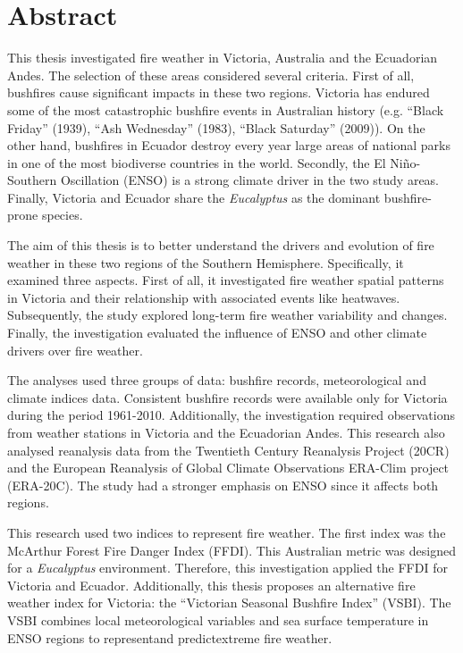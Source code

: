 
\chapter*{Abstract}

This thesis investigated fire weather in Victoria, Australia and the
Ecuadorian Andes. The selection of these areas considered several
criteria. First of all, bushfires cause significant impacts in these
two regions. Victoria has endured some of the most catastrophic bushfire
events in Australian history (e.g. \textquotedblleft Black Friday\textquotedblright{}
(1939), \textquotedblleft Ash Wednesday\textquotedblright{} (1983),
\textquotedblleft Black Saturday\textquotedblright{} (2009)). On the
other hand, bushfires in Ecuador destroy every year large areas of
national parks in one of the most biodiverse countries in the world.
Secondly, the El Ni\~no-Southern Oscillation (ENSO) is a strong climate
driver in the two study areas. Finally, Victoria and Ecuador share
the \textit{Eucalyptus} as the dominant bushfire-prone species. 

The aim of this thesis is to better understand the drivers and evolution
of fire weather in these two regions of the Southern Hemisphere. Specifically,
it examined three aspects. First of all, it investigated fire weather
spatial patterns in Victoria and their relationship with associated
events like heatwaves. Subsequently, the study explored long-term
fire weather variability and changes. Finally, the investigation evaluated the influence
of ENSO and other climate drivers over fire weather.

The analyses used three groups of data: bushfire records, meteorological
and climate indices data. Consistent bushfire records were available
only for Victoria during the period 1961-2010. Additionally, the investigation
required observations from weather stations in Victoria and the Ecuadorian
Andes. This research also analysed reanalysis data from the Twentieth
Century Reanalysis Project (20CR) and the European Reanalysis of Global
Climate Observations ERA-Clim project (ERA-20C). The study had a stronger
emphasis on ENSO since it affects both regions. 

This research used two indices to represent fire
weather. The first index was the McArthur Forest Fire Danger Index
(FFDI). This Australian metric was designed for a \textit{Eucalyptus}
environment. Therefore, this investigation applied the FFDI for Victoria
and Ecuador. Additionally, this thesis proposes an alternative fire
weather index for Victoria: the ``Victorian Seasonal Bushfire Index''
(VSBI). The VSBI combines local meteorological variables and sea surface
temperature in ENSO regions to represent\textemdash and predict\textemdash extreme
fire weather. 

